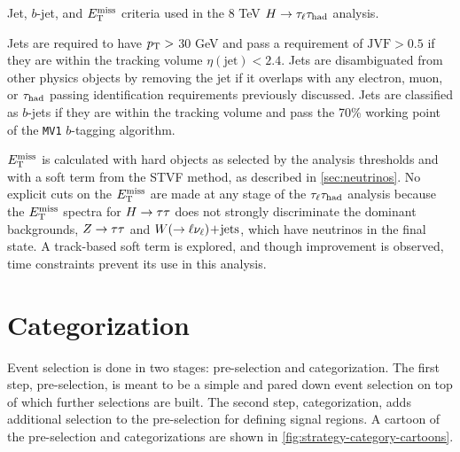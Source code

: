 \begin{table}[bp]
  \centering
  \renewcommand{\arraystretch}{1.4}
  \caption{Jet, $b$-jet, and $E_{\mathrm{T}}^{\mathrm{miss}}$ criteria used in the 8 TeV $H\rightarrow\tau_\ell\tau_\text{had}$ analysis.}
  
  \label{tab:strategy-objects-jetmet}
\end{table}

Jets are required to have $p_{\mathrm{T}} >$ 30 GeV and pass a requirement of $\text{JVF} > 0.5$ if they are within the tracking volume $\eta(\text{jet}) < 2.4$. Jets are disambiguated from other physics objects by removing the jet if it overlaps with any electron, muon, or $\tau_\text{had}$ passing identification requirements previously discussed. Jets are classified as $b$-jets if they are within the tracking volume and pass the 70\% working point of the \texttt{MV1} $b$-tagging algorithm.

$E_{\mathrm{T}}^{\mathrm{miss}}$ is calculated with hard objects as selected by the analysis thresholds and with a soft term from the STVF method, as described in \cref{sec:neutrinos}. No explicit cuts on the $E_{\mathrm{T}}^{\mathrm{miss}}$ are made at any stage of the $\tau_\ell\tau_\text{had}$ analysis because the $E_{\mathrm{T}}^{\mathrm{miss}}$ spectra for $H\rightarrow\tau\tau$ does not strongly discriminate the dominant backgrounds, $Z\rightarrow\tau\tau$ and $W (\rightarrow \ell\nu_\ell)\!+\!\text{jets}$, which have neutrinos in the final state. A track-based soft term is explored, and though improvement is observed, time constraints prevent its use in this analysis.

\section{Categorization}
\label{sec:strategy-categorization}

Event selection is done in two stages: pre-selection and categorization. The first step, pre-selection, is meant to be a simple and pared down event selection on top of which further selections are built. The second step, categorization, adds additional selection to the pre-selection for defining signal regions. A cartoon of the pre-selection and categorizations are shown in \cref{fig:strategy-category-cartoons}.

